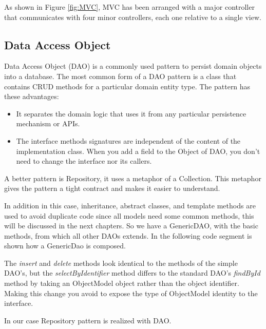 \documentclass[a4paper,12pt]{report}
\begin{document}
As shown in Figure \ref{fig:MVC}, MVC has been arranged with a major controller that communicates with four minor controllers, each one relative to a single view.


\subsection{Data Access Object}
Data Access Object (DAO) is a commonly used pattern to persist domain objects into a database. The most common form of a DAO pattern is a class that contains CRUD methods for a particular domain entity type.
The pattern has these advantages:
\begin{itemize}
\item It separates the domain logic that uses it from any particular persistence mechanism or APIs.
\item The interface methods signatures are independent of the content of the implementation class. When you add a field to the Object of DAO, you don’t need to change the interface nor its callers.
\end{itemize}

A better pattern is Repository, it uses a metaphor of a Collection. This metaphor gives the pattern a tight contract and makes it easier to understand.

In addition in this case, inheritance, abstract classes, and template methods are used to avoid duplicate code since all models need some common methods, this will be discussed in the next chapters.
So we have a GenericDAO, with the basic methods, from which all other DAOs extends.
In the following code segment is shown how a GenericDao is composed.



The \textit{insert} and \textit{delete} methods look identical to the methods of the simple DAO's, but the \textit{selectByIdentifier} method differs to the standard DAO’s \textit{findById} method by taking an ObjectModel object rather than the object identifier. 
Making this change you avoid to expose the type of ObjectModel identity to the interface.

In our case Repository pattern is realized with DAO.
\end{document}
